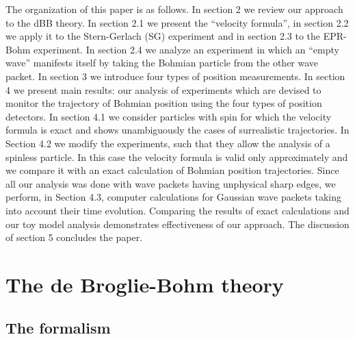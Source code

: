\documentclass[preprint,tightenlines]{elsarticle}
\begin{document}
 The organization
of this paper is as follows. In section 2 we review
our approach to the dBB theory. In section 2.1 we present the ``velocity formula'',
in section 2.2 we apply it to the Stern-Gerlach (SG) experiment and in
section 2.3 to the EPR-Bohm experiment. In section 2.4 we analyze an
experiment in which an ``empty wave'' manifests itself by taking
the Bohmian particle from the other wave packet. In section 3 we
introduce four types of position measurements. In section 4 we present main results: our  analysis of
experiments which are devised  to monitor the trajectory of Bohmian position
 using the four types of position detectors.
In section 4.1 we consider particles with spin for which  the velocity formula is exact and shows unambiguously
the cases of surrealistic trajectories. In Section 4.2 we modify
the experiments, such that they allow the analysis of a spinless particle.
In this case the velocity formula is valid only approximately and
we compare it with an exact calculation of Bohmian position trajectories.
Since all our analysis was done with wave packets having unphysical
sharp edges, we perform, in Section 4.3, computer calculations for Gaussian
wave packets taking into account their time evolution. Comparing the
results of exact calculations and our toy model analysis demonstrates
effectiveness of our approach. The discussion of section 5 concludes
the paper.


\section{ The de Broglie-Bohm theory}


\subsection{  The formalism}
\end{document}

